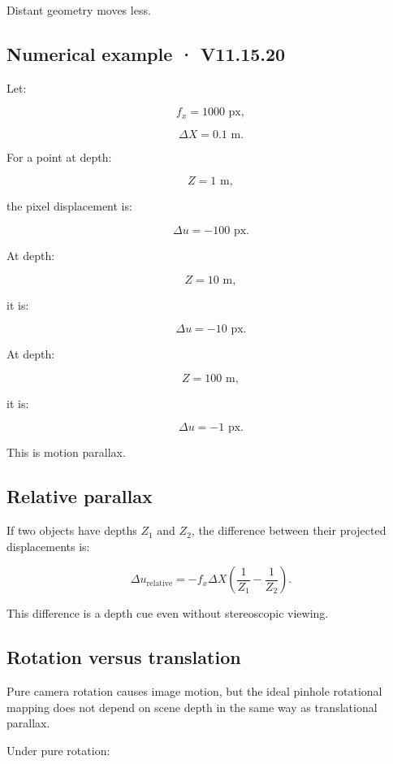 Distant geometry moves less.

\subsection{Numerical example · V11.15.20}\label{02-foundations-ii-ch035-numerical-example-v11.15.20}

Let:

\[ f_x=1000\text{ px}, \]

\[ \Delta X=0.1\text{ m}. \]

For a point at depth:

\[ Z=1\text{ m}, \]

the pixel displacement is:

\[ \boxed{\Delta u=-100\text{ px}}. \]

At depth:

\[ Z=10\text{ m}, \]

it is:

\[ \boxed{\Delta u=-10\text{ px}}. \]

At depth:

\[ Z=100\text{ m}, \]

it is:

\[ \boxed{\Delta u=-1\text{ px}}. \]

This is motion parallax.

\subsection{Relative parallax}\label{02-foundations-ii-ch035-relative-parallax}

If two objects have depths \(Z_1\) and \(Z_2\), the difference between their projected displacements is:

\[ \boxed{ \Delta u_{\mathrm{relative}} = -f_x\Delta X \left( \frac1{Z_1}-\frac1{Z_2} \right). } \]

This difference is a depth cue even without stereoscopic viewing.

\subsection{Rotation versus translation}\label{02-foundations-ii-ch035-rotation-versus-translation}

Pure camera rotation causes image motion, but the ideal pinhole rotational mapping does not depend on scene depth in the same way as translational parallax.

Under pure rotation:

